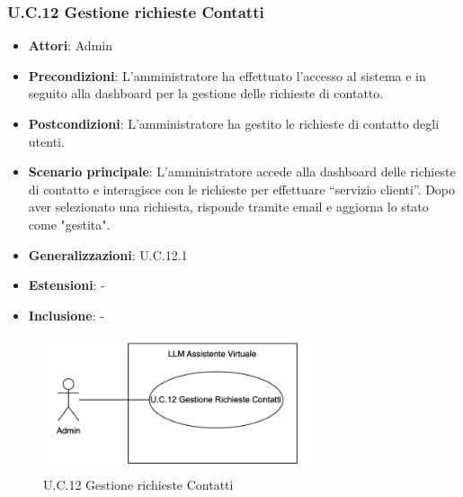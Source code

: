 \subsubsection{U.C.12 Gestione richieste Contatti}
\begin{itemize}
    \item \textbf{Attori}: Admin
    \item \textbf{Precondizioni}: L’amministratore ha effettuato l’accesso al sistema e in seguito alla dashboard per la gestione delle richieste di contatto.
    \item \textbf{Postcondizioni}: L’amministratore ha gestito le richieste di contatto degli utenti.
    \item \textbf{Scenario principale}: L’amministratore accede alla dashboard delle richieste di contatto e interagisce con le richieste per effettuare “servizio clienti”. Dopo aver selezionato una richiesta, risponde tramite email e aggiorna lo stato come "gestita".
    \item \textbf{Generalizzazioni}: U.C.12.1
    \item \textbf{Estensioni}: -
    \item \textbf{Inclusione}: -
\end{itemize}
\begin{figure}[H]
    \centering
    \includegraphics[width=0.7\textwidth]{img/UC12.png}
    \caption{U.C.12 Gestione richieste Contatti}
\end{figure}
\newpage

